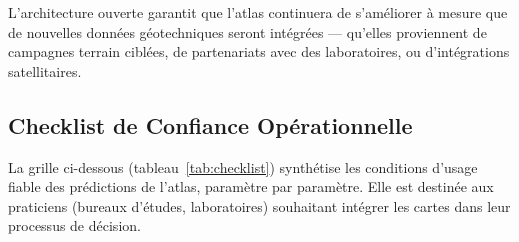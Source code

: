 \documentclass[10pt,a4paper,twocolumn]{article}
\begin{document}
	L'architecture ouverte garantit que l'atlas continuera de s'améliorer
	à mesure que de nouvelles données géotechniques seront intégrées ---
	qu'elles proviennent de campagnes terrain ciblées, de partenariats
	avec des laboratoires, ou d'intégrations satellitaires.
	
	
\clearpage
\subsection{Checklist de Confiance Opérationnelle}
\label{subsec:checklist}

La grille ci-dessous (tableau~\ref{tab:checklist}) synthétise les
conditions d'usage fiable des prédictions de l'atlas, paramètre
par paramètre.
Elle est destinée aux praticiens (bureaux d'études, laboratoires)
souhaitant intégrer les cartes dans leur processus de décision.
\end{document}
